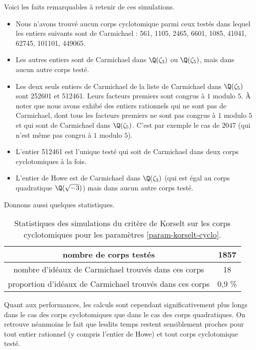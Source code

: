 Voici les faits remarquables à retenir de ces simulations.
	\begin{itemize}
		\item Nous n'avons trouvé aucun corps cyclotomique parmi ceux testés dans lequel les entiers suivants sont de Carmichael : 561, 1105, 2465, 6601, 1085, 41041, 62745, 101101, 449065.
		\item Les autres entiers sont de Carmichael dans $\Q(\zeta_3)$ ou $\Q(\zeta_5)$, mais dans aucun autre corps testé.
		\item Les deux seuls entiers de Carmichael de la liste de Carmichael dans $\Q(\zeta_5)$ sont 252601 et 512461. Leurs facteurs premiers sont congrus à $1$ modulo $5$. À noter que nous avons exhibé des entiers rationnels qui ne sont pas de Carmichael, dont tous les facteurs premiers ne sont pas congrus à $1$ modulo $5$ et qui sont de Carmichael dans $\Q(\zeta_5)$. C'est par exemple le cas de $2047$ (qui n'est même pas congru à $1$ modulo $5$). 
		\item L'entier 512461 est l'unique testé qui soit de Carmichael dans deux corps cyclotomiques à la fois.
		\item L'entier de Howe est de Carmichael dans $\Q(\zeta_3)$ (qui est égal au corps quadratique $\Q(\sqrt{-3})$) mais dans aucun autre corps testé.
	\end{itemize}

Donnons aussi quelques statistiques.

\begin{table}[H]
	\begin{center}
		\begin{tabular}{|c|c|}
			\hline
			nombre de corps testés & 1857 \\\hline
			nombre d'idéaux de Carmichael trouvés dans ces corps & 18 \\\hline
			proportion d'idéaux de Carmichael trouvés dans ces corps & 0,9 \% \\\hline
		\end{tabular}
		\caption{Statistiques des simulations du critère de Korselt sur les corps cyclotomiques pour les paramètres \ref{param-korselt-cyclo}.}
	\end{center}
\end{table}

Quant aux performances, les calculs sont cependant significativement plus longs dans le cas des corps cyclotomiques que dans le cas des corps quadratiques. On retrouve néanmoins le fait que lesdits temps restent sensiblement proches pour tout entier rationnel (y compris l'entier de Howe) et tout corps cyclotomique testé. 

